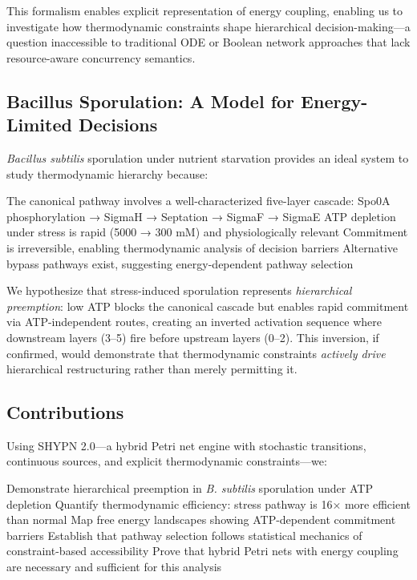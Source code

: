 \documentclass[twocolumn,11pt]{article}
\begin{document}
This formalism enables explicit representation of energy coupling, enabling us to investigate how thermodynamic constraints shape hierarchical decision-making—a question inaccessible to traditional ODE or Boolean network approaches that lack resource-aware concurrency semantics.

\subsection{Bacillus Sporulation: A Model for Energy-Limited Decisions}

\textit{Bacillus subtilis} sporulation under nutrient starvation provides an ideal system to study thermodynamic hierarchy because:

The canonical pathway involves a well-characterized five-layer cascade: Spo0A phosphorylation → SigmaH → Septation → SigmaF → SigmaE \citep{errington1993, piggot2004}
ATP depletion under stress is rapid (5000 → 300 mM) and physiologically relevant \citep{lopez2009}
Commitment is irreversible, enabling thermodynamic analysis of decision barriers
Alternative bypass pathways exist, suggesting energy-dependent pathway selection


We hypothesize that stress-induced sporulation represents \textit{hierarchical preemption}: low ATP blocks the canonical cascade but enables rapid commitment via ATP-independent routes, creating an inverted activation sequence where downstream layers (3--5) fire before upstream layers (0--2). This inversion, if confirmed, would demonstrate that thermodynamic constraints \textit{actively drive} hierarchical restructuring rather than merely permitting it.

\subsection{Contributions}

Using SHYPN 2.0—a hybrid Petri net engine with stochastic transitions, continuous sources, and explicit thermodynamic constraints—we:

Demonstrate hierarchical preemption in \textit{B. subtilis} sporulation under ATP depletion
Quantify thermodynamic efficiency: stress pathway is 16× more efficient than normal
Map free energy landscapes showing ATP-dependent commitment barriers
Establish that pathway selection follows statistical mechanics of constraint-based accessibility
Prove that hybrid Petri nets with energy coupling are necessary and sufficient for this analysis
\end{document}
